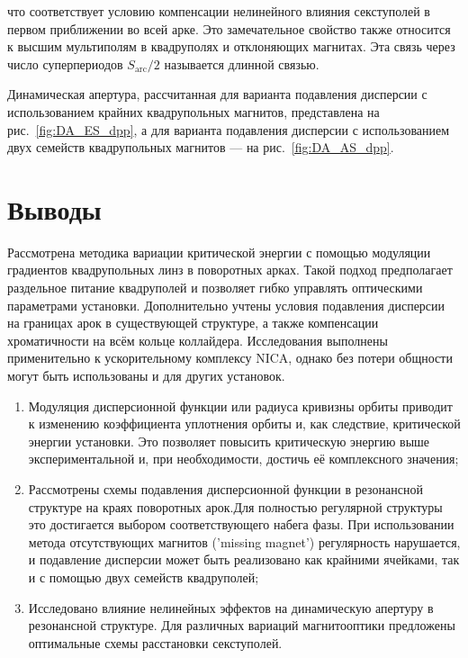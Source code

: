 \noindent что соответствует условию компенсации нелинейного влияния секступолей в первом приближении во всей арке. Это замечательное свойство также относится к высшим мультиполям в квадруполях и отклоняющих магнитах. Эта связь через число суперпериодов $S_{\text{arc}}/2$ называется длинной связью.

\par Динамическая апертура, рассчитанная для варианта подавления дисперсии с использованием крайних квадрупольных магнитов, представлена на рис.~\ref{fig:DA_ES_dpp}, а для варианта подавления дисперсии с использованием двух семейств квадрупольных магнитов — на рис.~\ref{fig:DA_AS_dpp}.

\section*{Выводы}
\par Рассмотрена методика вариации критической энергии с помощью модуляции градиентов квадрупольных линз в поворотных арках. Такой подход предполагает раздельное питание квадруполей и позволяет гибко управлять оптическими параметрами установки. Дополнительно учтены условия подавления дисперсии на границах арок в существующей структуре, а также компенсации хроматичности на всём кольце коллайдера. Исследования выполнены применительно к ускорительному комплексу NICA, однако без потери общности могут быть использованы и для других установок.

\begin{enumerate}

\item Модуляция дисперсионной функции или радиуса кривизны орбиты приводит к изменению коэффициента уплотнения орбиты и, как следствие, критической энергии установки. Это позволяет повысить критическую энергию выше экспериментальной и, при необходимости, достичь её комплексного значения;

\item Рассмотрены схемы подавления дисперсионной функции в резонансной структуре на краях поворотных арок.Для полностью регулярной структуры это достигается выбором соответствующего набега фазы. При использовании метода отсутствующих магнитов ('missing magnet') регулярность нарушается, и подавление дисперсии может быть реализовано как крайними ячейками, так и с помощью двух семейств квадруполей;

\item Исследовано влияние нелинейных эффектов на динамическую апертуру в резонансной структуре. Для различных вариаций магнитооптики предложены оптимальные схемы расстановки секступолей.

\end{enumerate}

\FloatBarrier